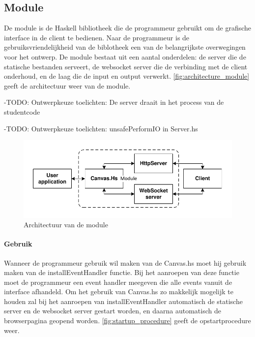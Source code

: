 \subsection{Module}
De module is de Haskell bibliotheek die de programmeur gebruikt om de grafische interface in de client te bedienen. Naar de programmeur is de gebruiksvriendelijkheid van de biblotheek een van de belangrijkste overwegingen voor het ontwerp. De module bestaat uit een aantal onderdelen: de server die de statische bestanden serveert, de websocket server die de verbinding met de client onderhoud, en de laag die de input en output verwerkt. \autoref{fig:architecture_module} geeft de architectuur weer van de module.

-TODO: Ontwerpkeuze toelichten: De server draait in het process van de studentcode

-TODO: Ontwerpkeuze toelichten: unsafePerformIO in Server.hs

\begin{figure}
\begin{center}
\includegraphics[keepaspectratio,width=\textwidth]{./images/module_architecture.pdf}
\caption{Architectuur van de module}
\label{fig:architecture_module}
\end{center}
\end{figure}


\paragraph{Gebruik} Wanneer de programmeur gebruik wil maken van de Canvas.hs moet hij gebruik maken van de installEventHandler functie. Bij het aanroepen van deze functie moet de programmeur een event handler meegeven die alle events vanuit de interface afhandeld. Om het gebruik van Canvas.hs zo makkelijk mogelijk te houden zal bij het aanroepen van installEventHandler automatisch de statische server en de websocket server gestart worden, en daarna automatisch de browserpagina geopend worden. \autoref{fig:startup_procedure} geeft de opstartprocedure weer.

